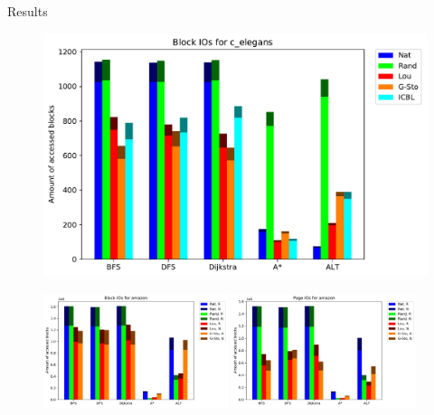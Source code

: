 \documentclass[rgb]{beamer}
\begin{document}
        \begin{frame}[allowframebreaks]{Results}
            \begin{figure}
                \begin{center}
                \includegraphics[keepaspectratio, height=0.8\textheight, width=\textwidth]{img/c_elegans_Block_unsorted_io_comparison.pdf}
                \end{center}
            \end{figure}
            
            \framebreak
            \begin{figure}
                \begin{center}
                \includegraphics[keepaspectratio, height=0.8\textheight, width=0.48\textwidth]{img/amazon_Block_unsorted_io_comparison.pdf}
                \includegraphics[keepaspectratio, height=0.8\textheight, width=0.48\textwidth]{img/amazon_Page_unsorted_io_comparison.pdf}
                \end{center}
            \end{figure}
            

\end{frame}
\end{document}
